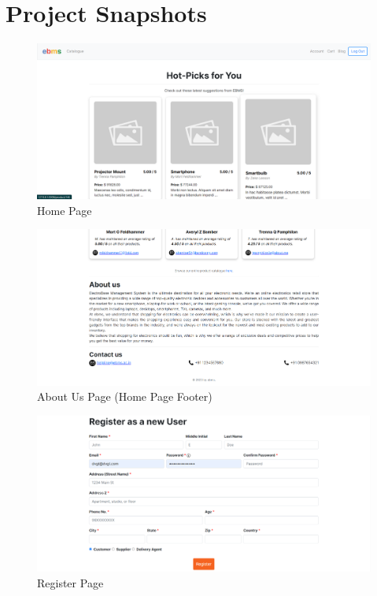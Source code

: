\section{Project Snapshots}

\divider

\begin{figure}[H]
    \includegraphics[width=1.0\textwidth]{./../Assets/home.png}
    \caption{Home Page}
\end{figure}

\divider

\pagebreak

\divider

\begin{figure}[H]
    \includegraphics[width=1.0\textwidth]{./../Assets/about-us.png}
    \caption{About Us Page (Home Page Footer)}
\end{figure}

\divider

\begin{figure}[H]
    \includegraphics[width=1.0\textwidth]{./../Assets/register.png}
    \caption{Register Page}
\end{figure}


